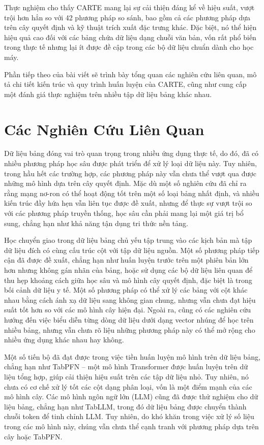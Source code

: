 \documentclass{article}
\begin{document}
Thực nghiệm cho thấy CARTE mang lại sự cải thiện đáng kể về hiệu suất, vượt trội hơn hẳn so với 42 phương pháp so sánh, bao gồm cả các phương pháp dựa trên cây quyết định và kỹ thuật trích xuất đặc trưng khác. Đặc biệt, nó thể hiện hiệu quả cao đối với các bảng chứa dữ liệu dạng chuỗi văn bản, vốn rất phổ biến trong thực tế nhưng lại ít được đề cập trong các bộ dữ liệu chuẩn dành cho học máy.

Phần tiếp theo của bài viết sẽ trình bày tổng quan các nghiên cứu liên quan, mô tả chi tiết kiến trúc và quy trình huấn luyện của CARTE, cũng như cung cấp một đánh giá thực nghiệm trên nhiều tập dữ liệu bảng khác nhau.


\section{Các Nghiên Cứu Liên Quan}
Dữ liệu bảng đóng vai trò quan trọng trong nhiều ứng dụng thực tế, do đó, đã có nhiều phương pháp học sâu được phát triển để xử lý loại dữ liệu này. Tuy nhiên, trong hầu hết các trường hợp, các phương pháp này vẫn chưa thể vượt qua được những mô hình dựa trên cây quyết định. Mặc dù một số nghiên cứu đã chỉ ra rằng mạng nơ-ron có thể hoạt động tốt trên một số loại bảng nhất định, và nhiều kiến trúc đầy hứa hẹn vẫn liên tục được đề xuất, nhưng để thực sự vượt trội so với các phương pháp truyền thống, học sâu cần phải mang lại một giá trị bổ sung, chẳng hạn như khả năng tận dụng tri thức nền tảng.

Học chuyển giao trong dữ liệu bảng chủ yếu tập trung vào các kịch bản mà tập dữ liệu đích có cùng cấu trúc cột với tập dữ liệu nguồn. Một số phương pháp tiếp cận đã được đề xuất, chẳng hạn như huấn luyện trước trên một phiên bản lớn hơn nhưng không gán nhãn của bảng, hoặc sử dụng các bộ dữ liệu liên quan để thu hẹp khoảng cách giữa học sâu và mô hình cây quyết định, đặc biệt là trong bối cảnh dữ liệu y tế. Một số phương pháp có thể xử lý các bảng với cột khác nhau bằng cách ánh xạ dữ liệu sang không gian chung, nhưng vẫn chưa đạt hiệu suất tốt hơn so với các mô hình cây hiện đại. Ngoài ra, cũng có các nghiên cứu hướng đến việc biểu diễn từng dòng dữ liệu dưới dạng vector nhúng để học trên nhiều bảng, nhưng vẫn chưa rõ liệu những phương pháp này có thể mở rộng cho nhiều ứng dụng khác nhau hay không.

Một số tiến bộ đã đạt được trong việc tiền huấn luyện mô hình trên dữ liệu bảng, chẳng hạn như TabPFN – một mô hình Transformer được huấn luyện trên dữ liệu tổng hợp, giúp cải thiện hiệu suất trên các tập dữ liệu nhỏ. Tuy nhiên, nó chưa có cơ chế xử lý tốt các cột dạng phân loại, vốn là một điểm mạnh của các mô hình cây. Các mô hình ngôn ngữ lớn (LLM) cũng đã được thử nghiệm cho dữ liệu bảng, chẳng hạn như TabLLM, trong đó dữ liệu bảng được chuyển thành chuỗi token để tinh chỉnh LLM. Tuy nhiên, do khó khăn trong việc xử lý số liệu trong các mô hình này, chúng vẫn chưa thể cạnh tranh với phương pháp dựa trên cây hoặc TabPFN.
\end{document}
